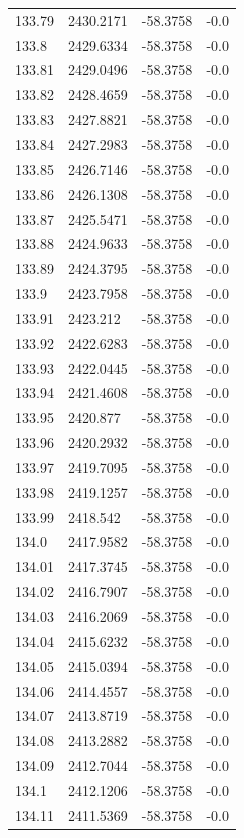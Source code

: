 \begin{table}[H]
\begin{tabular}{llll}
133.79 & 2430.2171 & -58.3758 & -0.0 \\
133.8 & 2429.6334 & -58.3758 & -0.0 \\
133.81 & 2429.0496 & -58.3758 & -0.0 \\
133.82 & 2428.4659 & -58.3758 & -0.0 \\
133.83 & 2427.8821 & -58.3758 & -0.0 \\
133.84 & 2427.2983 & -58.3758 & -0.0 \\
133.85 & 2426.7146 & -58.3758 & -0.0 \\
133.86 & 2426.1308 & -58.3758 & -0.0 \\
133.87 & 2425.5471 & -58.3758 & -0.0 \\
133.88 & 2424.9633 & -58.3758 & -0.0 \\
133.89 & 2424.3795 & -58.3758 & -0.0 \\
133.9 & 2423.7958 & -58.3758 & -0.0 \\
133.91 & 2423.212 & -58.3758 & -0.0 \\
133.92 & 2422.6283 & -58.3758 & -0.0 \\
133.93 & 2422.0445 & -58.3758 & -0.0 \\
133.94 & 2421.4608 & -58.3758 & -0.0 \\
133.95 & 2420.877 & -58.3758 & -0.0 \\
133.96 & 2420.2932 & -58.3758 & -0.0 \\
133.97 & 2419.7095 & -58.3758 & -0.0 \\
133.98 & 2419.1257 & -58.3758 & -0.0 \\
133.99 & 2418.542 & -58.3758 & -0.0 \\
134.0 & 2417.9582 & -58.3758 & -0.0 \\
134.01 & 2417.3745 & -58.3758 & -0.0 \\
134.02 & 2416.7907 & -58.3758 & -0.0 \\
134.03 & 2416.2069 & -58.3758 & -0.0 \\
134.04 & 2415.6232 & -58.3758 & -0.0 \\
134.05 & 2415.0394 & -58.3758 & -0.0 \\
134.06 & 2414.4557 & -58.3758 & -0.0 \\
134.07 & 2413.8719 & -58.3758 & -0.0 \\
134.08 & 2413.2882 & -58.3758 & -0.0 \\
134.09 & 2412.7044 & -58.3758 & -0.0 \\
134.1 & 2412.1206 & -58.3758 & -0.0 \\
134.11 & 2411.5369 & -58.3758 & -0.0 \\

\end{tabular}
\end{table}
